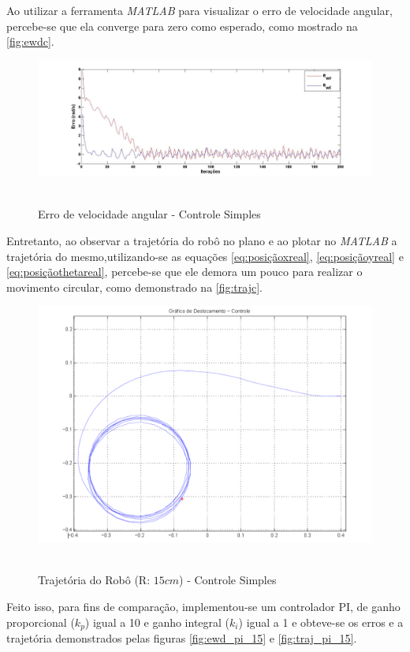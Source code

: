 Ao utilizar a ferramenta \emph{MATLAB} para visualizar o erro de velocidade angular, percebe-se que ela converge para zero como esperado, como mostrado na \autoref{fig:ewdc}.

\begin{figure}[!htb]
	\centering
	\caption{Erro de velocidade angular - Controle Simples}
	\includegraphics[width=1.0\textwidth]{./04-figuras/Ewd_b1c}
	\
	\label{fig:ewdc}
\end{figure}

Entretanto, ao observar a trajetória do robô no plano e ao plotar no \emph{MATLAB} a trajetória do mesmo,utilizando-se as equações \ref*{eq:posiçãoxreal}, \ref*{eq:posiçãoyreal} e \ref*{eq:posiçãothetareal}, percebe-se que ele demora um pouco para realizar o movimento circular, como demonstrado na \autoref{fig:trajc}.

\begin{figure}[!htb]
	\centering
	\caption{Trajetória do Robô (R: $15cm$) - Controle Simples}
	\includegraphics[width=1.0\textwidth]{./04-figuras/trajetoria_b1_15_c}
	\
	\label{fig:trajc}
\end{figure}

Feito isso, para fins de comparação, implementou-se um controlador PI, de ganho proporcional ($k_{p}$) igual a 10 e ganho integral ($k_{i}$) igual a 1 e obteve-se os erros e a trajetória demonstrados pelas figuras \ref*{fig:ewd_pi_15} e \ref*{fig:traj_pi_15}. 

